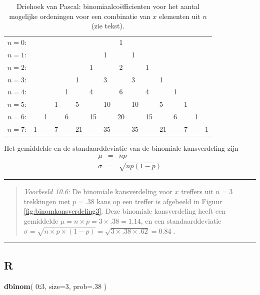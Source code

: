 \documentclass[
]{book}
\newenvironment{Shaded}{\begin{snugshade}}{\end{snugshade}}
\newcommand{\DataTypeTok}[1]{\textcolor[rgb]{0.13,0.29,0.53}{#1}}
\newcommand{\DecValTok}[1]{\textcolor[rgb]{0.00,0.00,0.81}{#1}}
\newcommand{\KeywordTok}[1]{\textcolor[rgb]{0.13,0.29,0.53}{\textbf{#1}}}
\newcommand{\NormalTok}[1]{#1}
\newcommand{\OperatorTok}[1]{\textcolor[rgb]{0.81,0.36,0.00}{\textbf{#1}}}
\begin{document}
\begin{longtable}[]{@{}llllllllclllllll@{}}
\caption{\label{tab:driehoekpascal} Driehoek van Pascal: binomiaalcoëfficienten voor het aantal mogelijke ordeningen voor een combinatie van \(x\) elementen uit \(n\) (zie tekst).}\tabularnewline
\toprule
\endhead
\(n= 0\): & & & & & & & & 1 & & & & & & &\tabularnewline
\(n= 1\): & & & & & & & 1 & & 1 & & & & & &\tabularnewline
\(n= 2\): & & & & & & 1 & & 2 & & 1 & & & & &\tabularnewline
\(n= 3\): & & & & & 1 & & 3 & & 3 & & 1 & & & &\tabularnewline
\(n= 4\): & & & & 1 & & 4 & & 6 & & 4 & & 1 & & &\tabularnewline
\(n= 5\): & & & 1 & & 5 & & 10 & & 10 & & 5 & & 1 & &\tabularnewline
\(n= 6\): & & 1 & & 6 & & 15 & & 20 & & 15 & & 6 & & 1 &\tabularnewline
\(n= 7\): & 1 & & 7 & & 21 & & 35 & & 35 & & 21 & & 7 & & 1\tabularnewline
\bottomrule
\end{longtable}

Het gemiddelde en de standaarddeviatie van de binomiale kansverdeling
zijn \[\begin{aligned}
    \mu & = & np \\
    \sigma & = & \sqrt{ np(1-p) }\end{aligned}\]

\begin{center}\rule{0.5\linewidth}{0.5pt}\end{center}

\begin{quote}
\emph{Voorbeeld 10.6:}
De binomiale kansverdeling voor \(x\) treffers uit \(n=3\) trekkingen met
\(p=.38\) kans op een treffer is afgebeeld in
Figuur \ref{fig:binomkansverdeling3}. Deze binomiale kansverdeling heeft
een gemiddelde \(\mu=n \times p = 3 \times .38 = 1.14\), en een
standaarddeviatie
\(\sigma = \sqrt{n \times p \times (1-p)} = \sqrt{ 3 \times .38 \times .62} = 0.84\)
.
\end{quote}

\begin{center}\rule{0.5\linewidth}{0.5pt}\end{center}

\hypertarget{r-4}{%
\subsection{R}\label{r-4}}

\begin{Shaded}
\begin{Highlighting}[]
\KeywordTok{dbinom}\NormalTok{( }\DecValTok{0}\OperatorTok{:}\DecValTok{3}\NormalTok{, }\DataTypeTok{size=}\DecValTok{3}\NormalTok{, }\DataTypeTok{prob=}\NormalTok{.}\DecValTok{38}\NormalTok{ )}
\end{Highlighting}
\end{Shaded}
\end{document}
